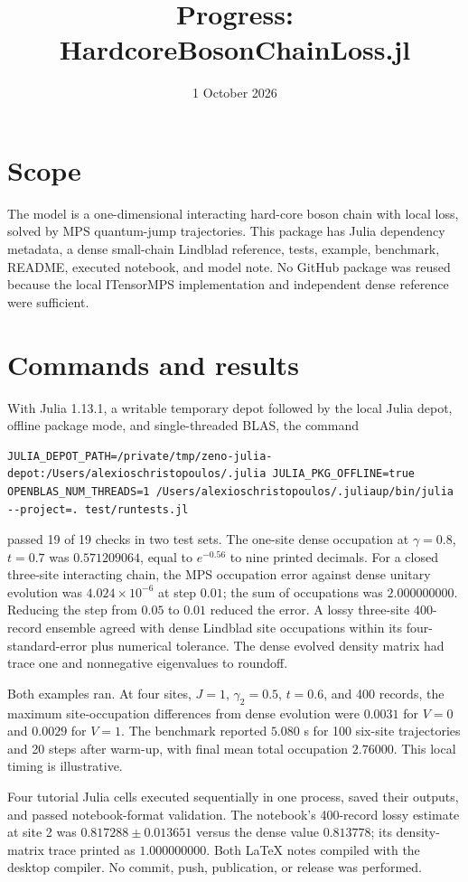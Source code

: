 \documentclass[11pt]{article}
\title{Progress: HardcoreBosonChainLoss.jl}
\date{1 October 2026}
\begin{document}
\maketitle
\section*{Scope}
The model is a one-dimensional interacting
hard-core boson chain with local loss, solved by MPS quantum-jump
trajectories. This package has Julia dependency metadata, a dense
small-chain Lindblad reference, tests, example, benchmark, README,
executed notebook, and model note. No GitHub package was reused because
the local ITensorMPS implementation and independent dense reference were
sufficient.
\section*{Commands and results}
With Julia 1.13.1, a writable temporary depot followed by the local
Julia depot, offline package mode, and single-threaded BLAS, the command
\begin{verbatim}
JULIA_DEPOT_PATH=/private/tmp/zeno-julia-depot:/Users/alexioschristopoulos/.julia JULIA_PKG_OFFLINE=true OPENBLAS_NUM_THREADS=1 /Users/alexioschristopoulos/.juliaup/bin/julia --project=. test/runtests.jl
\end{verbatim}
passed 19 of 19 checks in two test sets. The one-site dense occupation at
$\gamma=0.8$, $t=0.7$ was $0.571209064$, equal to $e^{-0.56}$ to nine
printed decimals. For a closed three-site interacting chain, the MPS
occupation error against dense unitary evolution was
$4.024\times10^{-6}$ at step $0.01$; the sum of occupations was
$2.000000000$. Reducing the step from $0.05$ to $0.01$ reduced the
error. A lossy three-site 400-record ensemble agreed with dense
Lindblad site occupations within its four-standard-error plus numerical
tolerance. The dense evolved density matrix had trace one and
nonnegative eigenvalues to roundoff.

Both examples ran. At four sites, $J=1$, $\gamma_2=0.5$, $t=0.6$,
and 400 records, the maximum site-occupation differences from dense
evolution were $0.0031$ for $V=0$ and $0.0029$ for $V=1$.
The benchmark reported $5.080$ s for 100 six-site trajectories and
20 steps after warm-up, with final mean total occupation $2.76000$.
This local timing is illustrative.

Four tutorial Julia cells executed sequentially in one process, saved
their outputs, and passed notebook-format validation. The notebook's
400-record lossy estimate at site 2 was $0.817288\pm0.013651$ versus
the dense value $0.813778$; its density-matrix trace printed as
$1.000000000$. Both LaTeX notes compiled with the desktop compiler.
No commit, push, publication, or release was performed.
\end{document}

